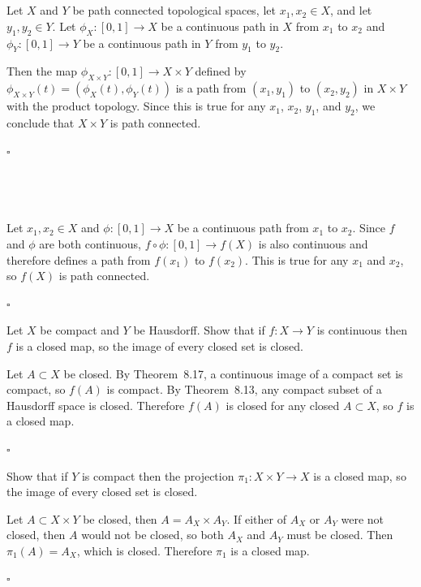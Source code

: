 \documentclass[a4paper]{article}
\begin{document}
\subsection{~} %

Let $X$ and $Y$ be path connected topological spaces, let $x_1, x_2 \in X$, and let $y_1, y_2 \in Y$. Let $\phi_X : [0, 1] \to X$ be a continuous path in $X$ from $x_1$ to $x_2$ and $\phi_Y : [0, 1] \to Y$ be a continuous path in $Y$ from $y_1$ to $y_2$.

Then the map $\phi_{X \times Y} : [0, 1] \to X \times Y$ defined by $\phi_{X \times Y}(t) = (\phi_X(t), \phi_Y(t))$ is a path from $(x_1, y_1)$ to $(x_2, y_2)$ in $X \times Y$ with the product topology. Since this is true for any $x_1$, $x_2$, $y_1$, and $y_2$, we conclude that $X \times Y$ is path connected.

\hfill $\square$

\subsection{~} %

Let $x_1, x_2 \in X$ and $\phi : [0, 1] \to X$ be a continuous path from $x_1$ to $x_2$. Since $f$ and $\phi$ are both continuous, $f \circ \phi : [0, 1] \to f(X)$ is also continuous and therefore defines a path from $f(x_1)$ to $f(x_2)$. This is true for any $x_1$ and $x_2$, so $f(X)$ is path connected.

\hfill $\square$



\begin{questionbody}
Let $X$ be compact and $Y$ be Hausdorff. Show that if $f : X \to Y$ is continuous then $f$ is a closed map, so the image of every closed set is closed.
\end{questionbody}

Let $A \subset X$ be closed. By Theorem~8.17, a continuous image of a compact set is compact, so $f(A)$ is compact. By Theorem~8.13, any compact subset of a Hausdorff space is closed. Therefore $f(A)$ is closed for any closed $A \subset X$, so $f$ is a closed map.

\hfill $\square$



\begin{questionbody}
Show that if $Y$ is compact then the projection $\pi_1 : X \times Y \to X$ is a closed map, so the image of every closed set is closed.
\end{questionbody}

Let $A \subset X \times Y$ be closed, then $A = A_X \times A_Y$. If either of $A_X$ or $A_Y$ were not closed, then $A$ would not be closed, so both $A_X$ and $A_Y$ must be closed. Then $\pi_1(A) = A_X$, which is closed. Therefore $\pi_1$ is a closed map.

\hfill $\square$

\end{document}
